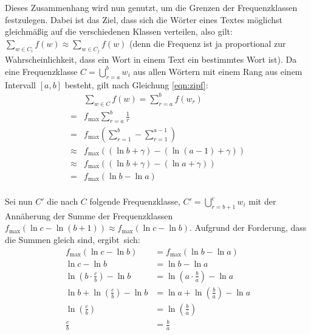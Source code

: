 Dieses Zusammenhang wird nun genutzt, um die Grenzen der Frequenzklassen festzulegen. Dabei ist das Ziel, dass sich die Wörter eines Textes möglichst gleichmäßig auf die verschiedenen
Klassen verteilen, also gilt: $\displaystyle \sum_{w \in C_i} f(w) \approx \sum_{w \in C_j} f(w)$ (denn die Frequenz ist ja proportional zur Wahrscheinlichkeit, dass ein Wort in einem Text ein bestimmtes Wort ist).
Da eine Frequenzklasse $C = \bigcup_{r=a}^b w_i$ aus allen Wörtern mit einem Rang aus einem Intervall $[a,b]$ besteht, gilt nach Gleichung \ref{eqn:zipf}:\footnotemark{}
\begin{align*}
	&\sum_{w \in C} f(w) =	\sum_{r=a}^b f(w_r)\\
=	&f_{\max} \sum_{r=a}^b \frac{1}{r}\\
=	&f_{\max} (\sum_{r=1}^b-\sum_{r=1}^{a-1})\\
\approx	&f_{\max} ((\ln b + \gamma)-(\ln (a-1) + \gamma))\\
\approx	&f_{\max} ((\ln b + \gamma)-(\ln a + \gamma))\\
=	&f_{\max} (\ln b -\ln a)\\
\end{align*}

Sei nun $C'$ die nach $C$ folgende Frequenzklasse, $C' = \bigcup_{r=b+1}^c w_i$ mit der Annäherung der Summe der Frequenzklassen $f_{\max} (\ln c -\ln (b+1)) \approx f_{\max} (\ln c -\ln b)$.
Aufgrund der Forderung, dass die Summen gleich sind, ergibt~sich:
\begin{align}\label{eqn:frequency_class_relation}
f_{\max} (\ln c -\ln b)			&=	f_{\max} (\ln b -\ln a)\nonumber\\
\ln c -\ln b				&=	\ln b -\ln a\nonumber\\
\ln (b \cdot \frac{c}{b}) - \ln b	&=	\ln (a \cdot \frac{b}{a}) - \ln a\nonumber\\
\ln b + \ln (\frac{c}{b}) - \ln b	&=	\ln a + \ln (\frac{b}{a}) - \ln a\nonumber\\
\ln (\frac{c}{b}) 			&=	\ln (\frac{b}{a})\nonumber\\
\frac{c}{b} 				&=	\frac{b}{a}
\end{align}

